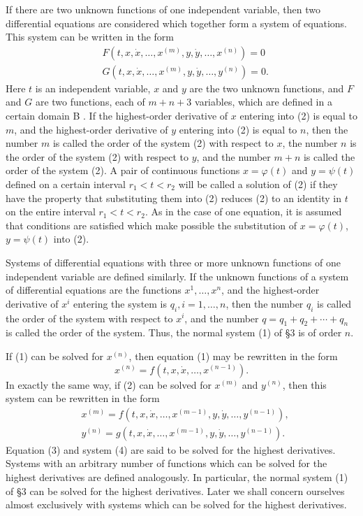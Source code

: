 \documentclass[10pt,a5paper]{book}
\theoremstyle{plain}
\theoremstyle{definition}
\theoremstyle{remark}
\begin{document}
If there are two unknown functions of one independent variable, then two differential equations are considered which together form a system of equations. This system can be written in the form
\begin{align*}
& F\left(t, x, \dot{x}, \ldots, x^{(m)}, y, \dot{y}, \ldots, x^{(n)}\right)=0 \\
& G\left(t, x, \dot{x}, \ldots, x^{(m)}, y, \dot{y}, \ldots, y^{(n)}\right)=0 . \tag{2}
\end{align*}
Here $t$ is an independent variable, $x$ and $y$ are the two unknown functions, and $F$ and $G$ are two functions, each of $m+n+3$ variables, which are defined in a certain domain B . If the highest-order derivative of $x$ entering into (2) is equal to $m$, and the highest-order derivative of $y$ entering into (2) is equal to $n$, then the number $m$ is called the order of the system (2) with respect to $x$, the number $n$ is the order of the system (2) with respect to $y$, and the number $m+n$ is called the order of the system (2). A pair of continuous functions $x=\varphi(t)$ and $y=\psi(t)$ defined on a certain interval $r_{1}<t<r_{2}$ will be called a solution of (2) if they have the property that substituting them into (2) reduces (2) to an identity in $t$ on the entire interval $r_{1}<t<r_{2}$. As in the case of one equation, it is assumed that conditions are satisfied which make possible the substitution of $x=\varphi(t)$, $y=\psi(t)$ into (2).

Systems of differential equations with three or more unknown functions of one independent variable are defined similarly. If the unknown functions of a system of differential equations are the functions $x^{1}, \ldots, x^{n}$, and the highest-order derivative of $x^{i}$ entering the system is $q_{i}, i=1, \ldots, n$, then the number $q_{i}$ is called the order of the system with respect to $x^{i}$, and the number $q=q_{1}+q_{2}+\cdots+q_{n}$ is called the order of the system. Thus, the normal system (1) of §3 is of order $n$.

If (1) can be solved for $x^{(n)}$, then equation (1) may be rewritten in the form
\begin{equation*}
x^{(n)}=f\left(t, x, \dot{x}, \ldots, x^{(n-1)}\right) . \tag{3}
\end{equation*}
In exactly the same way, if (2) can be solved for $x^{(m)}$ and $y^{(n)}$, then this system can be rewritten in the form
\begin{align*}
& x^{(m)}=f\left(t, x, \dot{x}, \ldots, x^{(m-1)}, y, \dot{y}, \ldots, y^{(n-1)}\right), \\
& y^{(n)}=g\left(t, x, \dot{x}, \ldots, x^{(m-1)}, y, \dot{y}, \ldots, y^{(n-1)}\right) . \tag{4}
\end{align*}
Equation (3) and system (4) are said to be solved for the highest derivatives. Systems with an arbitrary number of functions which can be solved for the highest derivatives are defined analogously. In particular, the normal system (1) of §3 can be solved for the highest derivatives. Later we shall concern ourselves almost exclusively with systems which can be solved for the highest derivatives.
\end{document}
